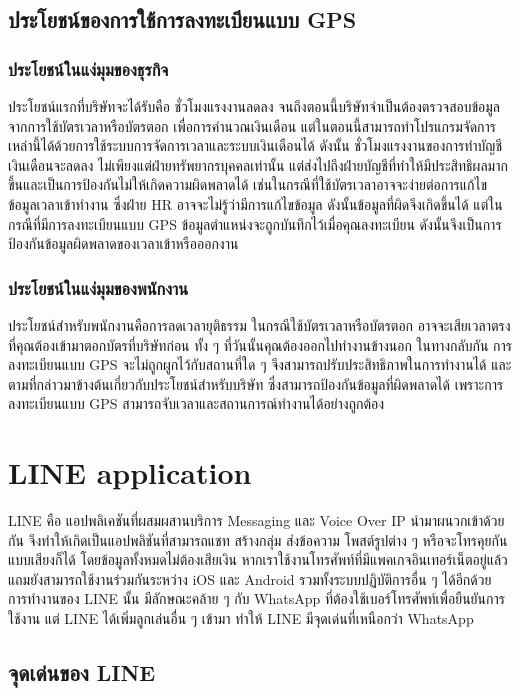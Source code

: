 \subsection{ประโยชน์ของการใช้การลงทะเบียนแบบ GPS}
\subsubsection{ประโยชน์ในแง่มุมของธุรกิจ}
\quad ประโยชน์แรกที่บริษัทจะได้รับคือ ชั่วโมงแรงงานลดลง จนถึงตอนนี้บริษัทจำเป็นต้องตรวจสอบข้อมูลจากการใช้บัตรเวลาหรือบัตรตอก เพื่อการคํานวณเงินเดือน แต่ในตอนนี้สามารถทำโปรแกรมจัดการเหล่านี้ได้ด้วยการใช้ระบบการจัดการเวลาและระบบเงินเดือนได้ ดังนั้น ชั่วโมงแรงงานของการทำบัญชีเงินเดือนจะลดลง ไม่เพียงแต่ฝ่ายทรัพยากรบุคคลเท่านั้น แต่ส่งไปถึงฝ่ายบัญชีที่ทำให้มีประสิทธิผลมากขึ้นและเป็นการป้องกันไม่ให้เกิดความผิดพลาดได้ เช่นในกรณีที่ใช้บัตรเวลาอาจจะง่ายต่อการแก้ไขข้อมูลเวลาเข้าทำงาน ซึ่งฝ่าย HR อาจจะไม่รู้ว่ามีการแก้ไขข้อมูล ดังนั้นข้อมูลที่ผิดจึงเกิดขึ้นได้ แต่ในกรณีที่มีการลงทะเบียนแบบ GPS ข้อมูลตำแหน่งจะถูกบันทึกไว้เมื่อคุณลงทะเบียน ดังนั้นจึงเป็นการป้องกันข้อมูลผิดพลาดของเวลาเข้าหรือออกงาน 
\subsubsection{ประโยชน์ในแง่มุมของพนักงาน}
\quad ประโยชน์สำหรับพนักงานคือการลดเวลายุติธรรม ในกรณีใช้บัตรเวลาหรือบัตรตอก อาจจะเสียเวลาตรงที่คุณต้องเข้ามาตอกบัตรที่บริษัทก่อน ทั้ง ๆ ที่วันนั้นคุณต้องออกไปทำงานข้างนอก ในทางกลับกัน การลงทะเบียนแบบ GPS จะไม่ถูกผูกไว้กับสถานที่ใด ๆ จึงสามารถปรับประสิทธิภาพในการทำงานได้  และตามที่กล่าวมาข้างต้นเกี่ยวกับประโยชน์สำหรับบริษัท ซึ่งสามารถป้องกันข้อมูลที่ผิดพลาดได้ เพราะการลงทะเบียนแบบ GPS สามารถจับเวลาและสถานการณ์ทำงานได้อย่างถูกต้อง 

\section{LINE application}
\quad LINE คือ แอปพลิเคชันที่ผสมผสานบริการ Messaging และ Voice Over IP นำมาผนวกเข้าด้วยกัน จึงทำให้เกิดเป็นแอปพลิชันที่สามารถแชท สร้างกลุ่ม ส่งข้อความ โพสต์รูปต่าง ๆ  หรือจะโทรคุยกันแบบเสียงก็ได้  โดยข้อมูลทั้งหมดไม่ต้องเสียเงิน หากเราใช้งานโทรศัพท์ที่มีแพคเกจอินเทอร์เน็ตอยู่แล้ว แถมยังสามารถใช้งานร่วมกันระหว่าง iOS และ Android รวมทั้งระบบปฏิบัติการอื่น ๆ ได้อีกด้วย การทำงานของ LINE นั้น มีลักษณะคล้าย ๆ กับ WhatsApp ที่ต้องใช้เบอร์โทรศัพท์เพื่อยืนยันการใช้งาน แต่ LINE ได้เพิ่มลูกเล่นอื่น ๆ เข้ามา ทำให้ LINE มีจุดเด่นที่เหนือกว่า WhatsApp  

\subsection{จุดเด่นของ LINE} 
